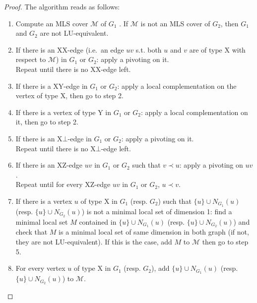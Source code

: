 \documentclass[a4paper,UKenglish,cleveref,autoref,thm-restate]{arxiv}
\begin{document}
\begin{proof}
    
    The algorithm reads as follows:

    \begin{enumerate}
        \item Compute an MLS cover $\mathcal M$ of $G_1$ \cite{claudet2024covering}. If $\mathcal M$ is not an MLS cover of $G_2$, then $G_1$ and $G_2$ are not LU-equivalent.
        \item If there is an XX-edge (i.e.~an edge $uv$ s.t. both $u$ and $v$ are of type X with respect to $\mathcal M$) in $G_1$ or $G_2$: apply a pivoting on it.\\
        Repeat until there is no XX-edge left.
        \item If there is a XY-edge in $G_1$ or $G_2$: apply a local complementation on the vertex of type X, then go to step 2.
        \item If there is a vertex of type Y in $G_1$ or $G_2$: apply a local complementation on it, then go to step 2.
        \item If there is an X$\bot$-edge in $G_1$ or $G_2$: apply a pivoting on it.\\
        Repeat until there is no X$\bot$-edge left.

        \item If there is an XZ-edge $uv$ in $G_1$ or $G_2$ such that $v\prec u$: apply a pivoting on $u v$.\\
        Repeat until for every XZ-edge $uv$ in $G_1$ or $G_2$, $u\prec v$.
 
        \item If there is a vertex $u$ of type X in $G_1$ (resp. $G_2$) such that $\{u\} \cup N_{G_1}(u)$ (resp.  $\{u\} \cup  N_{G_2}(u)$) is not a minimal local set of dimension 1: find a minimal local set $M$ contained in $\{u\} \cup N_{G_1}(u)$ (resp.  $\{u\} \cup  N_{G_2}(u)$) and check that $M$ is a minimal local set of same dimension in both graph (if not, they are not LU-equivalent). If this is the case, add $M$ to $\mathcal M$ then go to step 5.

        \item For every vertex $u$ of type X in $G_1$ (resp. $G_2$), add $\{u\} \cup N_{G_1}(u)$ (resp.  $\{u\} \cup N_{G_2}(u)$) to $\mathcal M$.
    \end{enumerate}


\end{proof}
\end{document}
